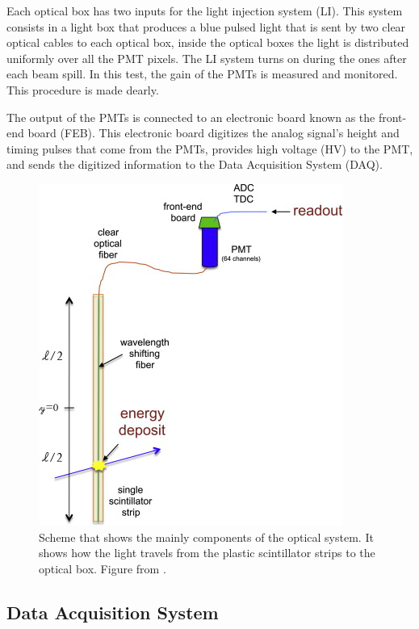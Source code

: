 Each optical box has two inputs for the light injection system (LI). This system consists in a light box that produces a blue pulsed light that is sent by two clear optical cables to each optical box, inside the optical boxes the light is distributed uniformly over all the PMT pixels. The LI system turns on during the ones after each beam spill. In this test, the gain of the PMTs is measured and monitored. This procedure is made dearly. 

The output of the PMTs is connected to an electronic board known as the front-end board (FEB). This electronic board digitizes the analog signal's height and timing pulses that come from the PMTs, provides high voltage (HV) to the PMT, and sends the digitized information to the Data Acquisition System (DAQ). 

\begin{figure}
    \centering
    \includegraphics{Figures/Chapter2/OpticalSystem.jpg}
    \caption{Scheme that shows the mainly components of the optical system. It shows how the light travels from the plastic scintillator strips to the optical box. Figure from \cite{MINERvA}.}
    \label{fig:MnvExp:MnvDetector:OpticalSystem}
\end{figure}

\subsection{Data Acquisition System }
\label{Cap:MnvExp:MnvDetector:DAQ}

